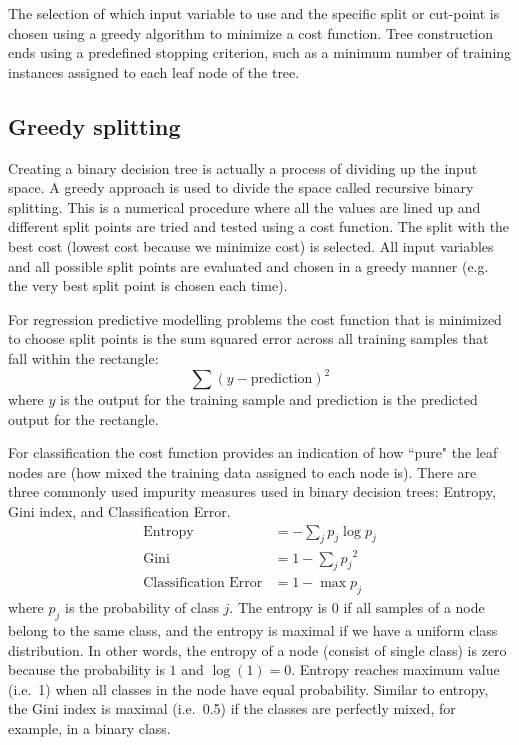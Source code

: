 \documentclass{article}
\begin{document}
The selection of which input variable to use and the specific split or cut-point is chosen using a greedy algorithm to minimize a cost function. Tree construction ends using a predefined stopping criterion, such as a minimum number of training instances assigned to each leaf node of the tree.


\subsection{Greedy splitting}
Creating a binary decision tree is actually a process of dividing up the input space. A greedy approach is used to divide the space called recursive binary splitting. This is a numerical procedure where all the values are lined up and different split points are tried and tested using a cost function. The split with the best cost (lowest cost because we minimize cost) is selected. All input variables and all possible split points are evaluated and chosen in a greedy manner (e.g. the very best split point is chosen each time).

For regression predictive modelling problems the cost function that is minimized to choose split points is the sum squared error across all training samples that fall within the rectangle:
\begin{equation*}
\sum(y-\mbox{prediction})^2
\end{equation*}
where $y$ is the output for the training sample and prediction is the predicted output for the rectangle.

For classification the cost function provides an indication of how ``pure" the leaf nodes are (how mixed the training data assigned to each node is). There are three commonly used impurity measures used in binary decision trees: Entropy, Gini index, and Classification Error.
\begin{align*}
\mbox{Entropy} &= - \sum_j p_j \log p_j \\
\mbox{Gini} &= 1 - \sum_j {p_j}^2 \\
\mbox{Classification Error} &= 1 - \max {p_j}
\end{align*}
where $p_j$ is the probability of class $j$.
The entropy is $0$ if all samples of a node belong to the same class, and the entropy is maximal if we have a uniform class distribution. In other words, the entropy of a node (consist of single class) is zero because the probability is $1$ and $\log (1) = 0$. Entropy reaches maximum value (i.e.\ 1) when all classes in the node have equal probability. Similar to entropy, the Gini index is maximal (i.e.\ 0.5) if the classes are perfectly mixed, for example, in a binary class.
\end{document}
